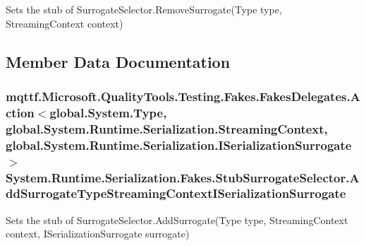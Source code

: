 Sets the stub of Surrogate\-Selector.\-Remove\-Surrogate(\-Type type, Streaming\-Context context)



\subsection{Member Data Documentation}
\hypertarget{class_system_1_1_runtime_1_1_serialization_1_1_fakes_1_1_stub_surrogate_selector_a9e42a45651badc39b4a4829874de74a4}{
\subsubsection[{Add\-Surrogate\-Type\-Streaming\-Context\-I\-Serialization\-Surrogate}]{\setlength{\rightskip}{0pt plus 5cm}mqttf.\-Microsoft.\-Quality\-Tools.\-Testing.\-Fakes.\-Fakes\-Delegates.\-Action$<$global.\-System.\-Type, global.\-System.\-Runtime.\-Serialization.\-Streaming\-Context, global.\-System.\-Runtime.\-Serialization.\-I\-Serialization\-Surrogate$>$ System.\-Runtime.\-Serialization.\-Fakes.\-Stub\-Surrogate\-Selector.\-Add\-Surrogate\-Type\-Streaming\-Context\-I\-Serialization\-Surrogate}}\label{class_system_1_1_runtime_1_1_serialization_1_1_fakes_1_1_stub_surrogate_selector_a9e42a45651badc39b4a4829874de74a4}


Sets the stub of Surrogate\-Selector.\-Add\-Surrogate(\-Type type, Streaming\-Context context, I\-Serialization\-Surrogate surrogate)

